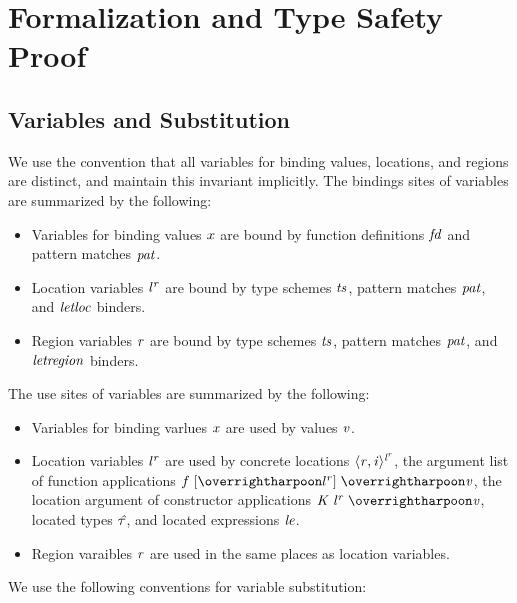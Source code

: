 \documentclass[showabstract,showacknowledgments,showpreface,showdedication]{iuphd}
\theoremstyle{nonumberplain}
\begin{document}


\appendix



\chapter{Formalization and Type Safety Proof}

\section{Variables and Substitution}
%
We use the convention that all variables for binding values,
locations, and regions are distinct, and maintain this invariant
implicitly.
%
The bindings sites of variables are summarized by the following:
%
\begin{itemize}
\item Variables for binding values $x$ are bound by function definitions
$\mathit{fd}$ and pattern matches $\mathit{pat}$.

\item Location variables ${\mathit{l}}^{\mathit{r}}$ are bound by type schemes $\mathit{ts}$, pattern matches
$\mathit{pat}$, and $\mathit{letloc}$ binders.

\item Region variables $\mathit{r}$ are bound by type schemes $\mathit{ts}$, pattern
matches $\mathit{pat}$, and $\mathit{letregion}$ binders.
\end{itemize}
%
The use sites of variables are summarized by the following:
\begin{itemize}
\item Variables for binding varlues $x$ are used by values $\mathit{v}$.

\item Location variables ${\mathit{l}}^{\mathit{r}}$ are used by concrete locations $\langle \mathit{r}, \mathit{i} \rangle ^{{\mathit{l}}^{\mathit{r}}}$,
the argument list of function applications
$\fapp{\overharpoon{\locreg{l}{r}}}{\overharpoon{\VAL}}$, the location
argument of constructor applications
$\datacon{\DC}{\keywd{\locreg{\loc}{\reg}}}{\overharpoon{\VAL}}$,
located types $\mathit{\hat{\tau}}$, and located expressions $\mathit{le}$.

\item Region varaibles $\mathit{r}$ are used in the same places as location variables.
\end{itemize}
%
We use the following conventions for variable substitution:
%
\end{document}
